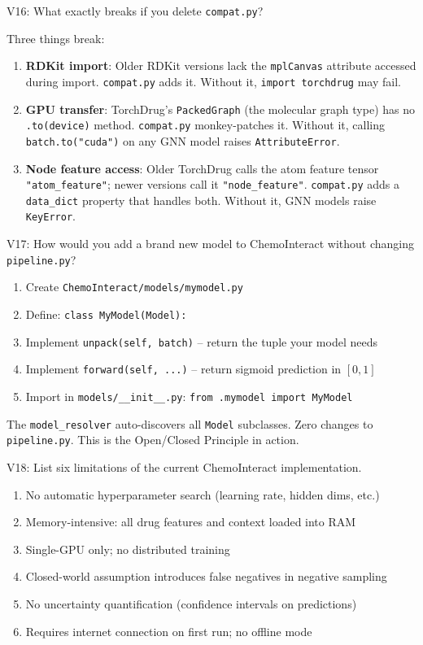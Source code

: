 \documentclass[12pt,a4paper,oneside]{book}
\begin{document}
\begin{tcolorbox}[vivabox]
V16: What exactly breaks if you delete \texttt{compat.py}?
\end{tcolorbox}
Three things break:
\begin{enumerate}
  \item \textbf{RDKit import}: Older RDKit versions lack the \texttt{mplCanvas} attribute accessed during import. \texttt{compat.py} adds it. Without it, \texttt{import torchdrug} may fail.
  \item \textbf{GPU transfer}: TorchDrug's \texttt{PackedGraph} (the molecular graph type) has no \texttt{.to(device)} method. \texttt{compat.py} monkey-patches it. Without it, calling \texttt{batch.to("cuda")} on any GNN model raises \texttt{AttributeError}.
  \item \textbf{Node feature access}: Older TorchDrug calls the atom feature tensor \texttt{"atom\_feature"}; newer versions call it \texttt{"node\_feature"}. \texttt{compat.py} adds a \texttt{data\_dict} property that handles both. Without it, GNN models raise \texttt{KeyError}.
\end{enumerate}

\begin{tcolorbox}[vivabox]
V17: How would you add a brand new model to ChemoInteract without changing \texttt{pipeline.py}?
\end{tcolorbox}
\begin{enumerate}
  \item Create \texttt{ChemoInteract/models/mymodel.py}
  \item Define: \texttt{class MyModel(Model):}
  \item Implement \texttt{unpack(self, batch)} -- return the tuple your model needs
  \item Implement \texttt{forward(self, ...)} -- return sigmoid prediction in $[0,1]$
  \item Import in \texttt{models/\_\_init\_\_.py}: \texttt{from .mymodel import MyModel}
\end{enumerate}
The \texttt{model\_resolver} auto-discovers all \texttt{Model} subclasses. Zero changes to \texttt{pipeline.py}. This is the Open/Closed Principle in action.

\begin{tcolorbox}[vivabox]
V18: List six limitations of the current ChemoInteract implementation.
\end{tcolorbox}
\begin{enumerate}
  \item No automatic hyperparameter search (learning rate, hidden dims, etc.)
  \item Memory-intensive: all drug features and context loaded into RAM
  \item Single-GPU only; no distributed training
  \item Closed-world assumption introduces false negatives in negative sampling
  \item No uncertainty quantification (confidence intervals on predictions)
  \item Requires internet connection on first run; no offline mode
\end{enumerate}
\end{document}
